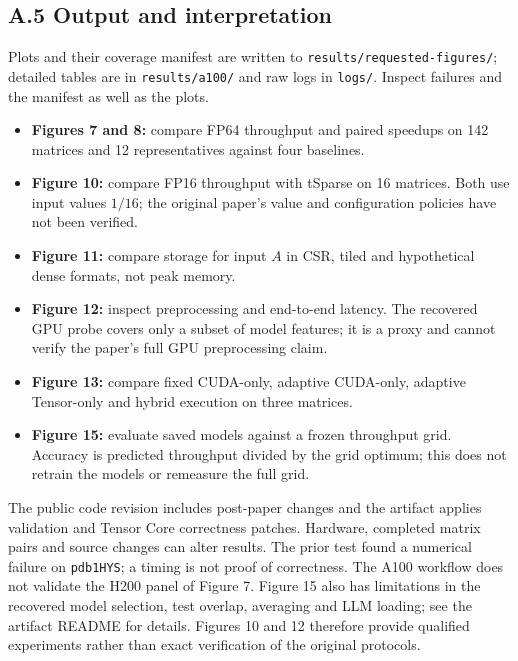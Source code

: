 \documentclass[10pt,twocolumn]{article}
\begin{document}
\subsection*{A.5 Output and interpretation}
Plots and their coverage manifest are written to \texttt{results/requested-figures/}; detailed tables are in \texttt{results/a100/} and raw logs in \texttt{logs/}. Inspect failures and the manifest as well as the plots.
\begin{itemize}
\item \textbf{Figures 7 and 8:} compare FP64 throughput and paired speedups on 142 matrices and 12 representatives against four baselines.
\item \textbf{Figure 10:} compare FP16 throughput with tSparse on 16 matrices. Both use input values $1/16$; the original paper's value and configuration policies have not been verified.
\item \textbf{Figure 11:} compare storage for input $A$ in CSR, tiled and hypothetical dense formats, not peak memory.
\item \textbf{Figure 12:} inspect preprocessing and end-to-end latency. The recovered GPU probe covers only a subset of model features; it is a proxy and cannot verify the paper's full GPU preprocessing claim.
\item \textbf{Figure 13:} compare fixed CUDA-only, adaptive CUDA-only, adaptive Tensor-only and hybrid execution on three matrices.
\item \textbf{Figure 15:} evaluate saved models against a frozen throughput grid. Accuracy is predicted throughput divided by the grid optimum; this does not retrain the models or remeasure the full grid.
\end{itemize}
The public code revision includes post-paper changes and the artifact applies validation and Tensor Core correctness patches. Hardware, completed matrix pairs and source changes can alter results. The prior test found a numerical failure on \texttt{pdb1HYS}; a timing is not proof of correctness. The A100 workflow does not validate the H200 panel of Figure 7. Figure 15 also has limitations in the recovered model selection, test overlap, averaging and LLM loading; see the artifact README for details. Figures 10 and 12 therefore provide qualified experiments rather than exact verification of the original protocols.
\end{document}
